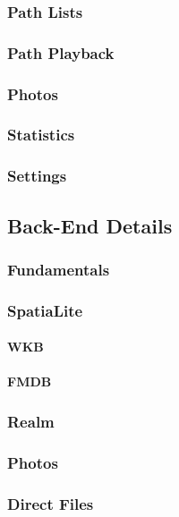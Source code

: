 \documentclass[12pt,a4paper]{article}
\begin{document}
            \subsubsection{Path Lists} %
            \subsubsection{Path Playback} %
            \subsubsection{Photos} %
            \subsubsection{Statistics} %
            \subsubsection{Settings} %
        \subsection{Back-End Details}
            \subsubsection{Fundamentals} %
            \subsubsection{SpatiaLite} %
                \paragraph{WKB} %
                \paragraph{FMDB} %
            \subsubsection{Realm} %
            \subsubsection{Photos} %
            \subsubsection{Direct Files} %
    \clearpage
    
\end{document}
